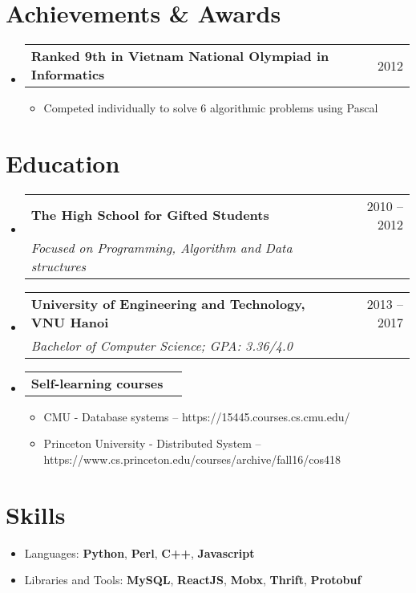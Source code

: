 \documentclass[a4paper,11pt]{article}
\makeatletter
\newcommand{\resumeItem}[1]{
  \item\small{
    {#1 \vspace{-2pt}}
  }
}
\newcommand{\resumeSubheadTwo}[2]{
  \vspace{-1pt}\item
    \begin{tabular*}{0.97\textwidth}{l@{\extracolsep{\fill}}r}
      \textbf{#1} & #2
    \end{tabular*}\vspace{-5pt}
}
\newcommand{\resumeSubhead}[3]{
  \vspace{-1pt}\item
    \begin{tabular*}{0.97\textwidth}{l@{\extracolsep{\fill}}r}
      \textbf{#1} & #2 \\
      \textit{\normalsize#3}
    \end{tabular*}\vspace{-5pt}
}
\newcommand{\resumeSubHeadingListStart}{\begin{itemize}[leftmargin=*]}
\newcommand{\resumeSubHeadingListEnd}{\end{itemize}}
\newcommand{\resumeItemListStart}{\begin{itemize}}
\newcommand{\resumeItemListEnd}{\end{itemize}\vspace{-5pt}}
\makeatother
\begin{document}
\section{Achievements \& Awards}
  \resumeSubHeadingListStart
    \resumeSubheadTwo
      {Ranked 9th in Vietnam National Olympiad in Informatics}{2012}
      \resumeItemListStart
        \resumeItem{Competed individually to solve 6 algorithmic problems using Pascal}
      \resumeItemListEnd
  \resumeSubHeadingListEnd



\section{Education}
  \resumeSubHeadingListStart
    \resumeSubhead
      {The High School for Gifted Students}{2010 -- 2012}
      {Focused on Programming, Algorithm and Data structures}
    \resumeSubhead
      {University of Engineering and Technology, VNU Hanoi}{2013 -- 2017}
      {Bachelor of Computer Science;  GPA: 3.36/4.0}
    \resumeSubheadTwo
      {Self-learning courses}{}
      \resumeItemListStart
        \resumeItem{CMU - Database systems -- https://15445.courses.cs.cmu.edu/}
        \resumeItem{Princeton University - Distributed System -- https://www.cs.princeton.edu/courses/archive/fall16/cos418}
      \resumeItemListEnd
  \resumeSubHeadingListEnd

\section{Skills}
  \resumeItemListStart
    \resumeItem{Languages: \textbf{Python}, \textbf{Perl}, \textbf{C++}, \textbf{Javascript}}
    \resumeItem{Libraries and Tools: \textbf{MySQL}, \textbf{ReactJS}, \textbf{Mobx}, \textbf{Thrift}, \textbf{Protobuf}}
  \resumeItemListEnd
\end{document}

